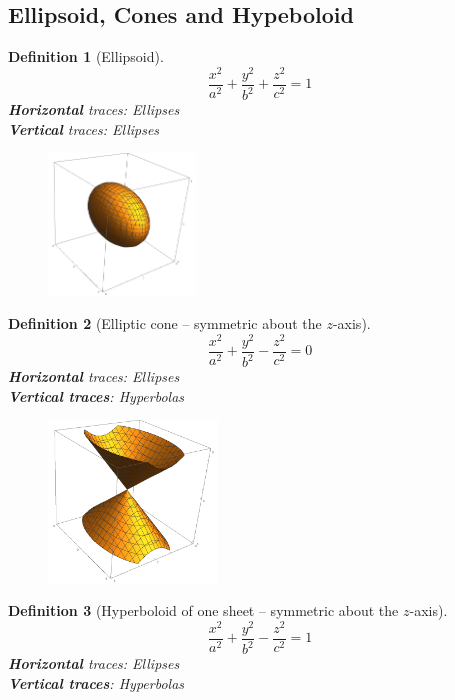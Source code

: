 \documentclass[12pt]{article}
\newtheorem{definition}{Definition}[section]
\theoremstyle{definition}
\begin{document}
\subsection{Ellipsoid, Cones and Hypeboloid}
\begin{definition}[Ellipsoid]
\hfill\\\normalfont
\[
\frac{x^2}{a^2}+\frac{y^2}{b^2}+\frac{z^2}{c^2}=1
\]
\textbf{Horizontal} traces: Ellipses\\
\textbf{Vertical} traces: Ellipses
\end{definition}
\begin{figure}[h]
\centering
\includegraphics[width = 0.35\textwidth]{2_3.png}
\end{figure}
\begin{definition}[Elliptic cone -- symmetric about the $z$-axis]
\hfill\\\normalfont
\[
\frac{x^2}{a^2}+\frac{y^2}{b^2}-\frac{z^2}{c^2}=0
\]
\textbf{Horizontal} traces: Ellipses\\
\textbf{Vertical traces}: Hyperbolas
\end{definition}
\begin{figure}[h]
\centering
\includegraphics[width = 0.4\textwidth]{2_4.png}
\end{figure}
\begin{definition}[Hyperboloid of one sheet -- symmetric about the $z$-axis]
\hfill\\\normalfont
\[
\frac{x^2}{a^2}+\frac{y^2}{b^2}-\frac{z^2}{c^2}=1
\]
\textbf{Horizontal} traces: Ellipses\\
\textbf{Vertical traces}: Hyperbolas
\end{definition}
\end{document}
